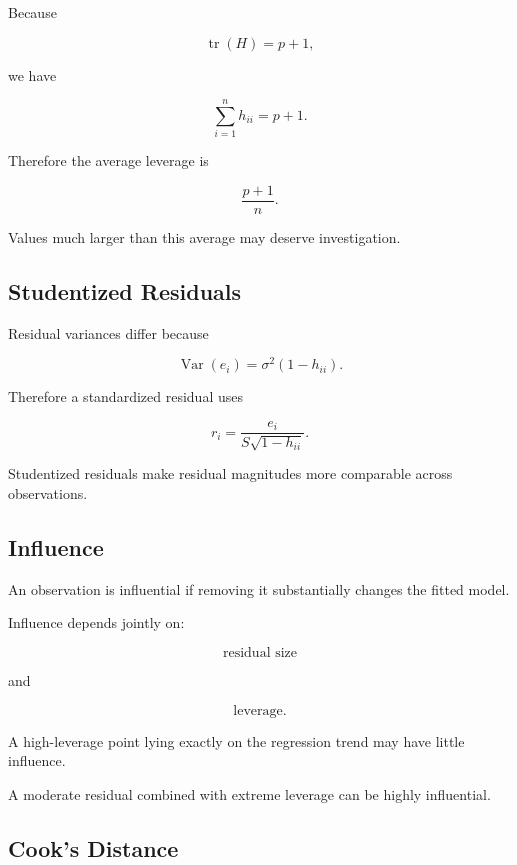 Because

\[
\operatorname{tr}(H)=p+1,
\]

we have

\[
\sum_{i=1}^{n}
h_{ii}
=
p+1.
\]

Therefore the average leverage is

\[
\boxed{
\frac{
p+1
}{n}.
}
\]

Values much larger than this average may deserve investigation.

\subsection{Studentized Residuals}
\label{subsec:studentized-residuals}

Residual variances differ because

\[
\operatorname{Var}(e_i)
=
\sigma^2(1-h_{ii}).
\]

Therefore a standardized residual uses

\[
\boxed{
r_i
=
\frac{
e_i
}{
S\sqrt{1-h_{ii}}
}.
}
\]

Studentized residuals make residual magnitudes more comparable across
observations.

\subsection{Influence}
\label{subsec:regression-influence}

An observation is influential if removing it substantially changes the
fitted model.

Influence depends jointly on:

\[
\boxed{
\text{residual size}
}
\]

and

\[
\boxed{
\text{leverage}.
}
\]

A high-leverage point lying exactly on the regression trend may have
little influence.

A moderate residual combined with extreme leverage can be highly
influential.

\subsection{Cook's Distance}
\label{subsec:cooks-distance}

